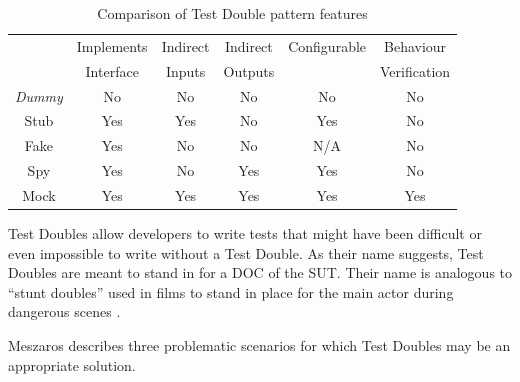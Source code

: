 
\begin{table}
  \centering
  \begin{tabular}{c|c|c|c|c|c}
    & Implements
    & Indirect
    & Indirect
    & Configurable
    & Behaviour
    \\
    & Interface
    & Inputs
    & Outputs
    &
    & Verification
    \\ \hline
    \textit{Dummy} & No & No & No & No & No      \\ \hline
    Stub           & Yes & Yes & No & Yes & No   \\ \hline
    Fake           & Yes & No & No & N/A & No    \\ \hline
    Spy            & Yes & No & Yes & Yes & No   \\ \hline
    Mock           & Yes & Yes & Yes & Yes & Yes \\ \hline
  \end{tabular}
  \caption{Comparison of Test Double pattern features}
  \label{table:testdoubles}
\end{table}

Test Doubles allow developers to write tests that might have been
difficult or even impossible to write without a Test Double. As their
name suggests, Test Doubles are meant to stand in for a DOC of the
SUT. Their name is analogous to ``stunt doubles'' used in films to
stand in place for the main actor during dangerous scenes
\cite{meszaros:xunit}.

Meszaros describes three problematic scenarios for which Test Doubles
may be an appropriate solution.

